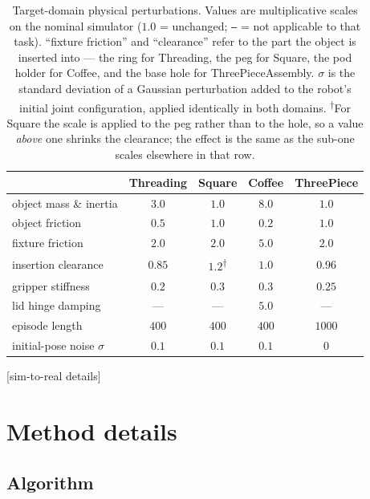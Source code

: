 \documentclass{article} %
\begin{document}
\begin{table}[h]
\centering
\caption{Target-domain physical perturbations. Values are multiplicative scales
on the nominal simulator ($1.0$ = unchanged; \texttt{---} = not applicable to
that task). ``fixture friction'' and ``clearance'' refer to the part the object
is inserted into --- the ring for Threading, the peg for Square, the pod holder
for Coffee, and the base hole for ThreePieceAssembly. $\sigma$ is the standard
deviation of a Gaussian perturbation added to the robot's initial joint
configuration, applied identically in both domains. \textsuperscript{$\dagger$}For Square the scale is applied to the peg rather
than to the hole, so a value \emph{above} one shrinks the clearance; the effect
is the same as the sub-one scales elsewhere in that row.}
\label{tab:app-targets}
\small
\begin{tabular}{lcccc}
\toprule
 & Threading & Square & Coffee & ThreePiece \\
\midrule
object mass \& inertia      & $3.0$   & $1.0$     & $8.0$   & $1.0$     \\
object friction             & $0.5$   & $1.0$    & $0.2$   & $1.0$     \\
fixture friction            & $2.0$   & $2.0$   & $5.0$   & $2.0$   \\
insertion clearance         & $0.85$  & $1.2$\textsuperscript{$\dagger$} & $1.0$ & $0.96$ \\
gripper stiffness           & $0.2$  & $0.3$   & $0.3$   & $0.25$  \\
lid hinge damping           & ---     & ---     & $5.0$   & ---     \\
\midrule
episode length              & $400$   & $400$   & $400$   & $1000$  \\
initial-pose noise $\sigma$ & $0.1$   & $0.1$   & $0.1$   & $0$     \\
\bottomrule
\end{tabular}
\end{table}

[sim-to-real details]

\section{Method details}

\subsection{Algorithm}
\end{document}
